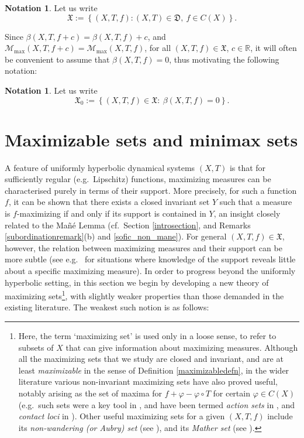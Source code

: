 \documentclass[reqno,11pt]{amsart}
\theoremstyle{definition}
\newtheorem{notation}[thm]{Notation}
\theoremstyle{remark}
\theoremstyle{remark}
\def \R {\mathbb R}
\def\m{\mathcal M}
\def\X{\mathfrak{X}}
\def\D{\mathfrak{D}}
\numberwithin{equation}{section}
\begin{document}
\begin{notation}
Let us write
$$
\X:=\left\{(X,T,f): (X,T)\in\D,\ f\in C(X)\right\}.
$$
\end{notation}

Since $\beta(X,T,f+c)=\beta(X,T,f)+c$, and $\m_{\max}(X,T,f+c)=\m_{\max}(X,T,f)$, for all $(X,T,f)\in\X$, $c\in\R$,
it will often be convenient to assume that $\beta(X,T,f)=0$, thus motivating the following notation:

\begin{notation}
Let us write
$$
\X_0:=
\left\{ (X,T,f)\in\X:\ \beta(X,T,f)=0\right\} .
$$
\end{notation}






\section{ Maximizable sets and minimax sets}\label{maximizableminimaxsection}




A feature of uniformly hyperbolic dynamical systems $(X,T)$ is that for sufficiently regular (e.g.~Lipschitz) functions, 
maximizing measures can be characterised purely in terms of their support.
More precisely, for such a function $f$, it can be shown that there exists a closed invariant set $Y$ such that a measure is $f$-maximizing if and only if its support is contained in $Y$,
an insight  closely related to
the Ma\~n\'e Lemma 
(cf.~Section \ref{introsection}, and Remarks \ref{subordinationremark}(b) and \ref{sofic_non_mane}).
For general $(X,T,f)\in \X$, however,
the relation between maximizing measures and their support can be more subtle
(see e.g.~\cite{BJ,Mor10} for situations where knowledge of the support reveals little about a specific maximizing measure).
In order to progress beyond the uniformly hyperbolic setting, in this section 
we begin by developing a new theory of maximizing
sets\footnote{Here, the term `maximizing set' is used only in a loose sense, to refer to subsets of $X$ that can give information about maximizing measures. Although all the maximizing sets that we study are closed and invariant, and 
are at least \emph{maximizable} in the sense of Definition \ref{maximizabledefn}, in the wider literature various non-invariant maximizing sets have also proved useful, notably
 arising as 
the set of maxima for $f+\varphi-\varphi\circ T$ for certain $\varphi\in C(X)$
(e.g.~such sets were a key tool in \cite{B00}, and
have been termed \emph{action sets} in \cite{CLT01}, and \emph{contact loci} in \cite{GLT09}). Other useful 
maximizing sets for a given $(X,T,f)$ include its \emph{non-wandering (or Aubry) set} (see \cite{CLT01, garibaldi}), and its 
\emph{Mather set} (see \cite{morrisplms}).},
with slightly weaker properties than those demanded in the existing literature. The weakest such notion is as follows:
\end{document}
